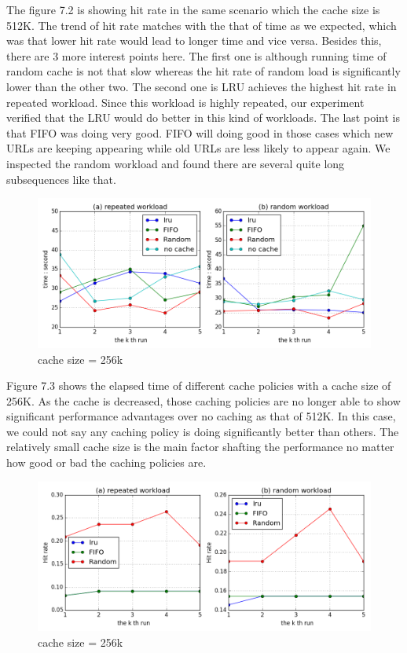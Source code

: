 \documentclass[paper=a4, fontsize=11pt]{scrartcl} %
\numberwithin{equation}{section} %
\numberwithin{figure}{section} %
\numberwithin{table}{section} %
\begin{document}
The figure 7.2 is showing hit rate in the same scenario which the cache size is 512K. The trend of hit rate matches with the that of time as we expected, which was that lower hit rate would lead to longer time and vice versa. Besides this, there are 3 more interest points here. The first one is although running time of random cache is not that slow whereas the hit rate of random load is significantly lower than the other two. The second one is LRU achieves the highest hit rate in repeated workload. Since this workload is highly repeated, our experiment verified that the LRU would do better in this kind of workloads. The last point is that FIFO was doing very good. FIFO will doing good in those cases which new URLs are keeping appearing while old URLs are less likely to appear again. We inspected the random workload and found there are several quite long subsequences like that.
\begin{figure}[h]
  \centering
  \includegraphics[width=\textwidth]{../data/time256k}
  \caption{cache size = 256k}
  \label{fig:time256k}
\end{figure}
Figure 7.3 shows the elapsed time of different cache policies with a cache size of 256K. As the cache is decreased, those caching policies are no longer able to show significant performance advantages over no caching as that of 512K. In this case, we could not say any caching policy is doing significantly better than others. The relatively small cache size is the main factor shafting the performance no matter how good or bad the caching policies are. 
\begin{figure}[h]
  \centering
  \includegraphics[width=\textwidth]{../data/hit256k}
  \caption{cache size = 256k}
  \label{fig:hit256k}
\end{figure}
\end{document}
